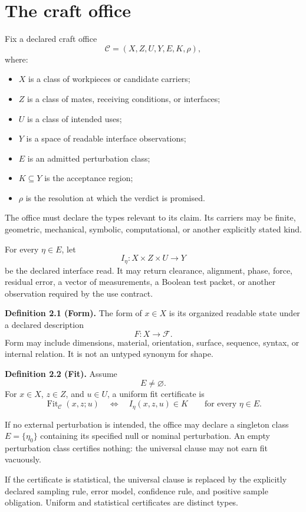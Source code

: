 \documentclass[11pt]{article}
\newcommand{\Fit}{\operatorname{Fit}}
\begin{document}
\section{The craft office}

Fix a declared craft office
\[
\mathcal C=(X,Z,U,Y,E,K,\rho),
\]
where:
\begin{itemize}
\item $X$ is a class of workpieces or candidate carriers;
\item $Z$ is a class of mates, receiving conditions, or interfaces;
\item $U$ is a class of intended uses;
\item $Y$ is a space of readable interface observations;
\item $E$ is an admitted perturbation class;
\item $K\subseteq Y$ is the acceptance region;
\item $\rho$ is the resolution at which the verdict is promised.
\end{itemize}

The office must declare the types relevant to its claim. Its carriers may be finite, geometric, mechanical, symbolic, computational, or another explicitly stated kind.

For every $\eta\in E$, let
\[
I_\eta:X\times Z\times U\longrightarrow Y
\]
be the declared interface read. It may return clearance, alignment, phase, force, residual error, a vector of measurements, a Boolean test packet, or another observation required by the use contract.

\textbf{Definition 2.1 (Form).}
The form of $x\in X$ is its organized readable state under a declared description
\[
F:X\longrightarrow\mathcal F.
\]
Form may include dimensions, material, orientation, surface, sequence, syntax, or internal relation. It is not an untyped synonym for shape.

\textbf{Definition 2.2 (Fit).}
Assume
\[
E\neq\varnothing.
\]
For $x\in X$, $z\in Z$, and $u\in U$, a uniform fit certificate is
\[
\Fit_{\mathcal C}(x,z;u)
\quad\Longleftrightarrow\quad
I_\eta(x,z,u)\in K\qquad\text{for every }\eta\in E.
\]

If no external perturbation is intended, the office may declare a singleton class $E=\{\eta_0\}$ containing its specified null or nominal perturbation. An empty perturbation class certifies nothing: the universal clause may not earn fit vacuously.

If the certificate is statistical, the universal clause is replaced by the explicitly declared sampling rule, error model, confidence rule, and positive sample obligation. Uniform and statistical certificates are distinct types.
\end{document}
